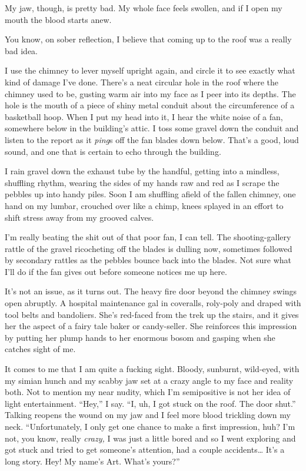 My jaw, though, is pretty bad. My whole face feels swollen, and if
I open my mouth the blood starts anew.

You know, on sober reflection, I believe that coming up to the roof
was a really bad idea.

I use the chimney to lever myself upright again, and circle it to
see exactly what kind of damage I’ve done. There’s a neat circular
hole in the roof where the chimney used to be, gusting warm air
into my face as I peer into its depths. The hole is the mouth of a
piece of shiny metal conduit about the circumference of a
basketball hoop. When I put my head into it, I hear the white noise
of a fan, somewhere below in the building’s attic. I toss some
gravel down the conduit and listen to the report as it \emph{ping}s
off the fan blades down below. That’s a good, loud sound, and one
that is certain to echo through the building.

I rain gravel down the exhaust tube by the handful, getting into a
mindless, shuffling rhythm, wearing the sides of my hands raw and
red as I scrape the pebbles up into handy piles. Soon I am
shuffling afield of the fallen chimney, one hand on my lumbar,
crouched over like a chimp, knees splayed in an effort to shift
stress away from my grooved calves.

I’m really beating the shit out of that poor fan, I can tell. The
shooting-gallery rattle of the gravel ricocheting off the blades is
dulling now, sometimes followed by secondary rattles as the pebbles
bounce back into the blades. Not sure what I’ll do if the fan gives
out before someone notices me up here.

It’s not an issue, as it turns out. The heavy fire door beyond the
chimney swings open abruptly. A hospital maintenance gal in
coveralls, roly-poly and draped with tool belts and bandoliers.
She’s red-faced from the trek up the stairs, and it gives her the
aspect of a fairy tale baker or candy-seller. She reinforces this
impression by putting her plump hands to her enormous bosom and
gasping when she catches sight of me.

It comes to me that I am quite a fucking sight. Bloody, sunburnt,
wild-eyed, with my simian hunch and my scabby jaw set at a crazy
angle to my face and reality both. Not to mention my near nudity,
which I’m semipositive is not her idea of light entertainment.
“Hey,” I say. “I, uh, I got stuck on the roof. The door shut.”
Talking reopens the wound on my jaw and I feel more blood trickling
down my neck. “Unfortunately, I only get one chance to make a first
impression, huh? I’m not, you know, really \emph{crazy,} I was just
a little bored and so I went exploring and got stuck and tried to
get someone’s attention, had a couple accidents\ldots{} It’s a long
story. Hey! My name’s Art. What’s yours?”

